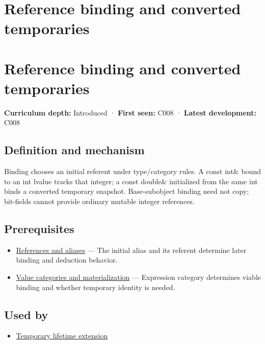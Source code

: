 \hypertarget{appendix-37856d997bb0}{}
\section*{Reference binding and converted temporaries}
\section{Reference binding and converted temporaries}\label{reference-binding-and-converted-temporaries}

\textbf{Curriculum depth:} Introduced · \textbf{First seen:} C008 · \textbf{Latest development:} C008

\subsection{Definition and mechanism}\label{definition-and-mechanism}

Binding chooses an initial referent under type/category rules. A const int\& bound to an int lvalue tracks that integer; a const double\& initialized from the same int binds a converted temporary snapshot. Base-subobject binding need not copy; bit-fields cannot provide ordinary mutable integer references.

\subsection{Prerequisites}\label{prerequisites}

\begin{itemize}
\tightlist
\item
  \hyperref[appendix-d6d562ca9fbb]{References and aliases} --- The initial alias and its referent determine later binding and deduction behavior.
\item
  \hyperref[appendix-1121b30eaeb0]{Value categories and materialization} --- Expression category determines viable binding and whether temporary identity is needed.
\end{itemize}

\subsection{Used by}\label{used-by}

\begin{itemize}
\tightlist
\item
  \hyperref[appendix-a978b29bbbb0]{Temporary lifetime extension}
\end{itemize}

